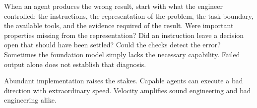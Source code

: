 
When an agent produces the wrong result, start with what the engineer controlled: the instructions, the representation of the problem, the task boundary, the available tools, and the evidence required of the result. Were important properties missing from the representation? Did an instruction leave a decision open that should have been settled? Could the checks detect the error? Sometimes the foundation model simply lacks the necessary capability. Failed output alone does not establish that diagnosis.



Abundant implementation raises the stakes. Capable agents can execute a bad direction with extraordinary speed. Velocity amplifies sound engineering and bad engineering alike.
